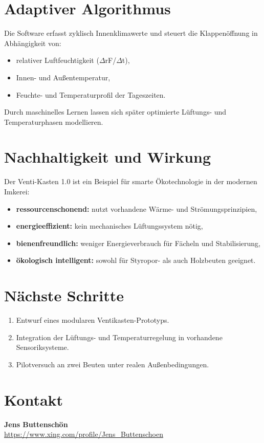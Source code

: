 \documentclass[11pt,a4paper]{article}
\begin{document}
\section{Adaptiver Algorithmus}
Die Software erfasst zyklisch Innenklimawerte und steuert die Klappen\"offnung in Abh\"angigkeit von:
\begin{itemize}
  \item relativer Luftfeuchtigkeit ($\Delta$rF/$\Delta$t),
  \item Innen- und Au\ss{}entemperatur,
  \item Feuchte- und Temperaturprofil der Tageszeiten.
\end{itemize}
Durch maschinelles Lernen lassen sich sp\"ater optimierte L\"uftungs- und Temperaturphasen modellieren.

\section{Nachhaltigkeit und Wirkung}
Der Venti-Kasten 1.0 ist ein Beispiel f\"ur smarte \"Okotechnologie in der modernen Imkerei:
\begin{itemize}
  \item \textbf{ressourcenschonend:} nutzt vorhandene W\"arme- und Str\"omungsprinzipien,
  \item \textbf{energieeffizient:} kein mechanisches L\"uftungssystem n\"otig,
  \item \textbf{bienenfreundlich:} weniger Energieverbrauch f\"ur F\"acheln und Stabilisierung,
  \item \textbf{\"okologisch intelligent:} sowohl f\"ur Styropor- als auch Holzbeuten geeignet.
\end{itemize}

\section{N\"achste Schritte}
\begin{enumerate}
  \item Entwurf eines modularen Ventikasten-Prototyps.
  \item Integration der L\"uftungs- und Temperaturregelung in vorhandene Sensoriksysteme.
  \item Pilotversuch an zwei Beuten unter realen Au\ss{}enbedingungen.
\end{enumerate}

\section*{Kontakt}
\textbf{Jens Buttensch\"on} \\
\small{\url{https://www.xing.com/profile/Jens_Buttenschoen}}
\end{document}

